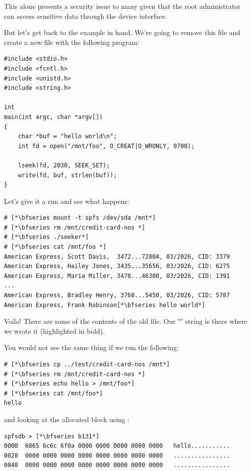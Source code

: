 \noindent
This alone presents a security issue to many given that the root administrator can access sensitive data through the device interface. 

But let's get back to the example in hand. We're going to remove this file and create a new file with the following program:

\begin{lstlisting}
#include <stdio.h>
#include <fcntl.h>
#include <unistd.h>
#include <string.h>

int
main(int argc, char *argv[])
{
    char *buf = "hello world\n";
    int fd = open("/mnt/foo", O_CREAT|O_WRONLY, 0700);

    lseek(fd, 2030, SEEK_SET);
    write(fd, buf, strlen(buf));
}
\end{lstlisting}

\noindent
Let's give it a run and see what happens:

\begin{lstlisting}
# [*\bfseries mount -t spfs /dev/sda /mnt*]
# [*\bfseries rm /mnt/credit-card-nos *]
# [*\bfseries ./seeker*]
# [*\bfseries cat /mnt/foo *]
American Express, Scott Davis,  3472...72804, 03/2026, CID: 3379
American Express, Hailey Jones, 3435...35656, 03/2026, CID: 6275
American Express, Maria Miller, 3478...46300, 03/2026, CID: 1391
...
American Express, Bradley Henry, 3768...5450, 03/2026, CID: 5787
American Express, Frank Robinson[*\bfseries hello world*]
\end{lstlisting}

\noindent
Voila! There are some of the contents of the old file. Our "" string is there where we wrote it (highlighted in bold).

You would not see the same thing if we run the following:

\begin{lstlisting}
# [*\bfseries cp ../test/credit-card-nos /mnt*]
# [*\bfseries rm /mnt/credit-card-nos *]
# [*\bfseries echo hello > /mnt/foo*]
# [*\bfseries cat /mnt/foo*]
hello
\end{lstlisting}

\noindent
and looking at the allocated block using :

\begin{lstlisting}
spfsdb > [*\bfseries b131*]
0000  6865 6c6c 6f0a 0000 0000 0000 0000 0000   hello...........
0020  0000 0000 0000 0000 0000 0000 0000 0000   ................
0040  0000 0000 0000 0000 0000 0000 0000 0000   ................
\end{lstlisting}

